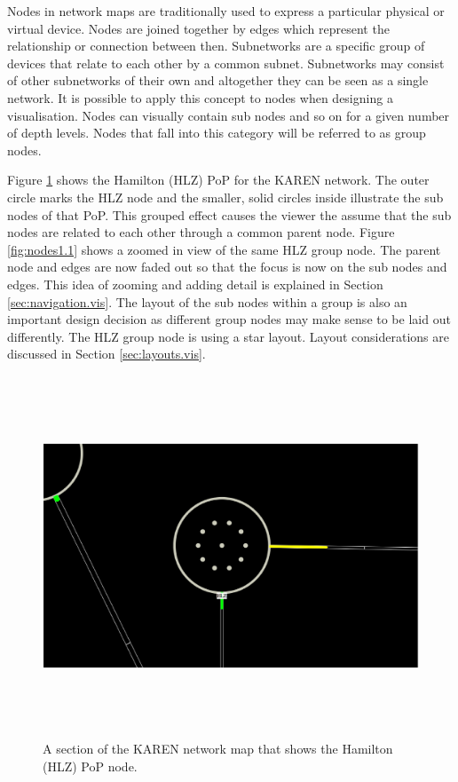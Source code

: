 \documentclass[11pt, a4paper]{article}
\begin{document}
Nodes in network maps are traditionally used to express a particular physical or
virtual device. Nodes are joined together by edges which represent the
relationship or connection between then. Subnetworks are a specific group of
devices that relate to each other by a common subnet. Subnetworks may consist of
other subnetworks of their own and altogether they can be seen as a single
network. It is possible to apply this concept to nodes when designing a
visualisation. Nodes can visually contain sub nodes and so on for a given number
of depth levels. Nodes that fall into this category will be referred to as
group nodes.

Figure \ref{fig:nodes1.0} shows the Hamilton (HLZ) PoP for the KAREN network.
The outer circle marks the HLZ node and the smaller, solid circles inside
illustrate the sub nodes of that PoP. This grouped effect causes the viewer the
assume that the sub nodes are related to each other through a common parent
node. Figure \ref{fig:nodes1.1} shows a zoomed in view of the same HLZ group
node. The parent node and edges are now faded out so that the focus is now on
the sub nodes and edges. This idea of zooming and adding detail is explained in
Section \ref{sec:navigation.vis}. The layout of the sub nodes within a group is
also an important design decision as different group nodes may make sense to be
laid out differently. The HLZ group node is using a star layout. Layout
considerations are discussed in Section \ref{sec:layouts.vis}.

 
\begin{figure}
\centering
\includegraphics[width=170mm,height=107.58mm]{assets/nodes1-0.eps}
\caption{A section of the KAREN network map that shows the Hamilton (HLZ) PoP
node.}
\label{fig:nodes1.0}
\end{figure}
\end{document}
